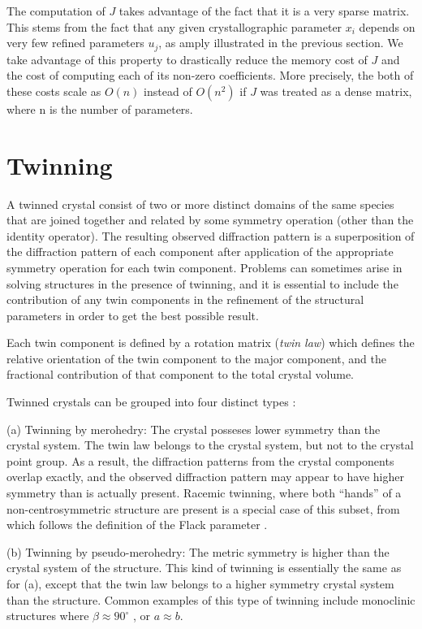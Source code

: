 \documentclass[pdf]{iucr}
\begin{document}
The computation of $J$ takes advantage of the fact that it is a very sparse matrix. This stems from the fact that any given crystallographic parameter $x_i$ depends on very few refined parameters $u_j$, as amply illustrated in the previous section. We take advantage of this property to drastically reduce the memory cost of $J$ and the cost of computing each of its non-zero coefficients. More precisely, the both of these costs scale as $O(n)$ instead of $O(n^2)$ if $J$ was treated as a dense matrix, where n is the number of parameters.




\section{Twinning}
\label{sec:ls_twinning}
A twinned crystal consist of two or more distinct domains of the same species that are joined together and related by some symmetry operation (other than the identity operator). The resulting observed diffraction pattern is a superposition of the diffraction pattern of each component after application of the appropriate symmetry operation for each twin component. Problems can sometimes arise in solving structures in the presence of twinning, and it is essential to include the contribution of any twin components in the refinement of the structural parameters in order to get the best possible result.

Each twin component is defined by a rotation matrix (\emph{twin law}) which defines the relative orientation of the twin component to the major component, and the fractional contribution of that component to the total crystal volume.

Twinned crystals can be grouped into four distinct types \cite{Herbst-Irmer:jz0004}:

(a) Twinning by merohedry: The crystal posseses lower symmetry than the crystal system. The twin law belongs to the crystal system, but not to the crystal point group. As a result, the diffraction patterns from the crystal components overlap exactly, and the observed diffraction pattern may appear to have higher symmetry than is actually present. Racemic twinning, where both ``hands'' of a non-centrosymmetric structure are present is a special case of this subset, from which follows the definition of the Flack parameter \cite{Flack:a22047}.

(b) Twinning by pseudo-merohedry: The metric symmetry is higher than the crystal system of the structure. This kind of twinning is essentially the same as for (a), except that the twin law belongs to a higher symmetry crystal system than the structure. Common examples of this type of twinning include monoclinic structures where $ \beta \approx 90^\circ $ , or $ a \approx b $.
\end{document}
